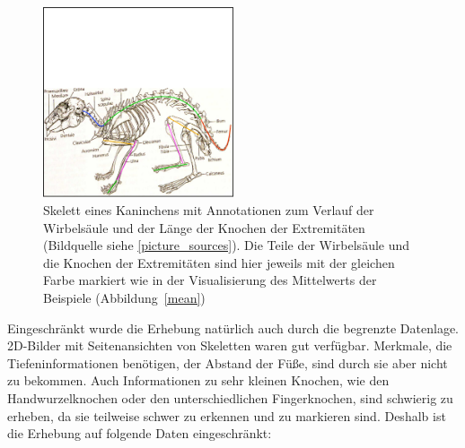  \begin{figure}
  \centering
  \includegraphics[width=0.5\textwidth]{../PCA/Skelettbilder/Kaninchen_farbig.png}
  \caption{Skelett eines Kaninchens mit Annotationen zum Verlauf der Wirbelsäule und der Länge der Knochen der Extremitäten (Bildquelle siehe \ref{picture_sources}). Die Teile der Wirbelsäule und die Knochen der Extremitäten sind hier jeweils mit der gleichen Farbe markiert wie in der Visualisierung des Mittelwerts der Beispiele (Abbildung~\ref{mean})}
  \label{kaninchen}
 \end{figure}

 Eingeschränkt wurde die Erhebung natürlich auch durch die begrenzte Datenlage. 2D-Bilder mit Seitenansichten von Skeletten waren gut verfügbar. Merkmale, die Tiefeninformationen benötigen, \zb der Abstand der Füße, sind durch sie aber nicht zu bekommen. Auch Informationen zu sehr kleinen Knochen, wie den Handwurzelknochen oder den unterschiedlichen Fingerknochen, sind schwierig zu erheben, da sie teilweise schwer zu erkennen und zu markieren sind. 
 Deshalb ist die Erhebung auf folgende Daten eingeschränkt:
  
